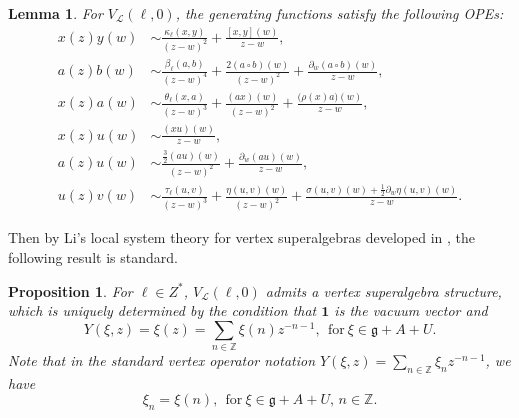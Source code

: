 \documentclass[12pt]{article}
\numberwithin{equation}{section}
\newtheorem{lemma}[theorem]{Lemma}
\newtheorem{proposition}[theorem]{Proposition}
\theoremstyle{definition}
\theoremstyle{plain}
\newcommand{\bZ}{\ensuremath{\mathbb{Z}}}
\newcommand{\fg}{\mathfrak{g}}
\newcommand{\cL}{\ensuremath{\mathcal{L}}}
\newcommand{\bone}{\mathbf{1 }}
\begin{document}
\begin{lemma}
    For $V_\cL(\ell,0)$, the generating functions satisfy the following OPEs\textup{:}
    \allowdisplaybreaks[4]
    \begin{align*}
        x(z)y(w) &\sim \frac{\kappa_\ell(x,y)}{(z-w)^2}+\frac{[x,y](w)}{z-w}, \\
        a(z)b(w) &\sim \frac{\beta_\ell(a,b)}{(z-w)^4}+\frac{2(a \circ b)(w)}{(z-w)^2}+\frac{\partial_w(a \circ b)(w)}{z-w}, \\
        x(z)a(w) &\sim \frac{\theta_\ell(x,a)}{(z-w)^3}+\frac{(ax)(w)}{(z-w)^2}+\frac{\big(\rho(x)a\big)(w)}{z-w},\\
        x(z)u(w) &\sim \frac{(xu)(w)}{z-w},\\
        a(z)u(w) &\sim \frac{\frac{3}{2}(au)(w)}{(z-w)^2}+\frac{\partial_w(au)(w)}{z-w}, \\
        u(z)v(w) &\sim \frac{\tau_\ell(u,v)}{(z-w)^3}+\frac{\eta(u,v)(w)}{(z-w)^2}+\frac{\sigma(u,v)(w)+\frac{1}{2}\partial_w\eta(u,v)(w)}{z-w}.
    \end{align*}
\end{lemma}

Then by Li's local system theory for vertex superalgebras developed in \cite{Li}, the following result is standard.

\begin{proposition}\label{prop:VSA}
     For $\ell\in Z^*$, $V_\cL(\ell,0)$ admits a vertex superalgebra structure, which is uniquely determined by the condition that $\bone$ is the vacuum vector and
     \begin{equation*}
         Y(\xi,z)=\xi(z)=\sum_{n\in\bZ}\xi(n)z^{-n-1},\ \ \text{for}\ \xi\in\fg+A+U.
     \end{equation*}
     Note that in the standard vertex operator notation $Y(\xi,z)=\sum_{n\in\bZ}\xi_nz^{-n-1}$, we have
     \begin{equation*}
         \xi_n=\xi(n),\ \ \text{for}\ \xi\in\fg+A+U,\,n\in\bZ.
     \end{equation*}
\end{proposition}
\end{document}
